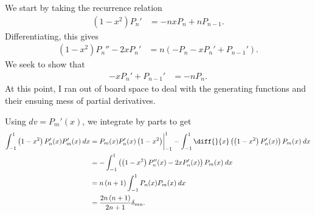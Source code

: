 \documentclass[10pt]{mypackage}
\begin{document}
\RaggedRight
\begin{solution}[32.20]
  We start by taking the recurrence relation
  \begin{align*}
    \left( 1-x^2 \right)P_n' &= -nxP_n + nP_{n-1}.\label{eq:derivative_recursion}\tag{$\ast$}
  \end{align*}
  Differentiating, this gives
  \begin{align*}
    \left( 1-x^2 \right)P_n'' - 2xP_n' &= n\left( -P_n - xP_n' + P_{n-1}' \right). 
  \end{align*}
  We seek to show that
  \begin{align*}
    -xP_n' + P_{n-1}' &= -nP_n.
  \end{align*}
  At this point, I ran out of board space to deal with the generating functions and their ensuing mess of partial derivatives.
\end{solution}
\begin{solution}[32.21]
  Using $dv=P_m'(x)$, we integrate by parts to get
  \begin{align*}
    \int_{-1}^{1} \left( 1-x^2 \right)P_n'(x)P_m'(x)\:dx &= P_m(x)P_n'(x)\left( 1-x^2 \right)\biggr\vert_{-1}^{1} - \int_{-1}^{1} \diff{}{x}\left( \left( 1-x^2 \right)P_n'(x) \right)P_m(x)\:dx\\
                                                         &= - \int_{-1}^{1} \left( \left( 1-x^2 \right)P_n''(x) - 2xP_n'(x) \right)P_{m}(x)\:dx\\
                                                         &= n\left( n+1 \right) \int_{-1}^{1} P_n(x)P_m(x)\:dx\\
                                                         &= \frac{2n\left( n+1 \right)}{2n+1} \delta_{mn}.
  \end{align*}
\end{solution}
\begin{solution}[32.23]

\end{solution}
\begin{solution}[35.4]

\end{solution}
\end{document}
